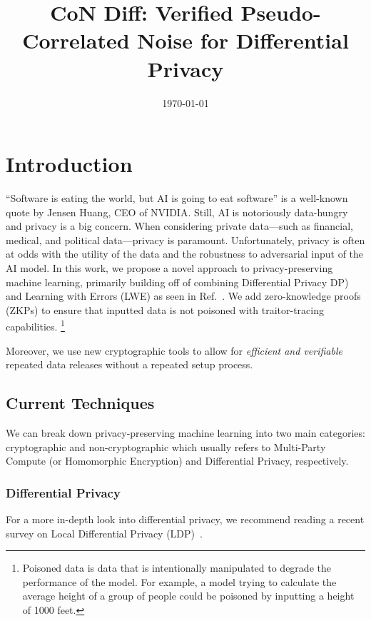 \documentclass[11pt]{article}
\newcommand{\myname}{Lev Stambler}
\begin{document}
\title{CoN Diff: Verified Pseudo-Correlated Noise for Differential Privacy}


\date{\today}
\maketitle




\section{Introduction}
    ``Software is eating the world, but AI is going to eat software'' is a well-known quote by Jensen Huang, CEO of NVIDIA.
    Still, AI is notoriously data-hungry and privacy is a big concern.
    When considering private data---such as financial, medical, and political data---privacy is paramount.
    Unfortunately, privacy is often at odds with the utility of the data and the robustness to adversarial input of the AI model.
    In this work, we propose a novel approach to privacy-preserving machine learning, primarily building off of combining Differential Privacy DP) and Learning with Errors (LWE) as seen in Ref.~\cite{stevens2021efficientdifferentiallyprivatesecure}.
    We add zero-knowledge proofs (ZKPs) to ensure that inputted data is not poisoned with traitor-tracing capabilities.
    \footnote{Poisoned data is data that is intentionally manipulated to degrade the performance of the model.
For example, a model trying to calculate the average height of a group of people could be poisoned by inputting a height of 1000 feet.}
    
    Moreover, we use new cryptographic tools to allow for \emph{efficient and verifiable} repeated data releases without a repeated setup process.

\subsection{Current Techniques}
We can break down privacy-preserving machine learning into two main categories: cryptographic and non-cryptographic which usually refers to Multi-Party Compute (or Homomorphic Encryption) and Differential Privacy, respectively.

\subsubsection*{Differential Privacy}
For a more in-depth look into differential privacy, we recommend reading a recent survey on Local Differential Privacy (LDP)~\cite{yang2023local}.
\end{document}
